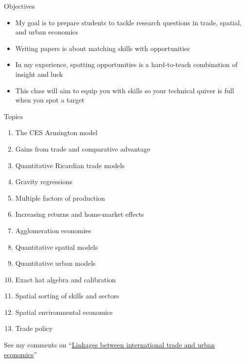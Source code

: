 \documentclass[10pt,notes=hide,aspectratio=169]{beamer}
\begin{document}
\begin{frame}{Objectives}
\begin{itemize}
\item My goal is to prepare students to tackle research questions in trade, spatial, and urban economics
\item Writing papers is about matching skills with opportunities
\item In my experience, spotting opportunities is a hard-to-teach combination of insight and luck
\item This class will aim to equip you with skills so your technical quiver is full when you spot a target
\end{itemize}
\end{frame}
\begin{frame}{Topics}
\begin{enumerate}
\item The CES Armington model
\item Gains from trade and comparative advantage
\item Quantitative Ricardian trade models
\item Gravity regressions
\item Multiple factors of production
\item Increasing returns and home-market effects
\item Agglomeration economies
\item Quantitative spatial models
\item Quantitative urban models
\item Exact hat algebra and calibration
\item Spatial sorting of skills and sectors
\item Spatial environmental economics
\item Trade policy
\end{enumerate}
See my comments on ``\href{https://tradediversion.net/2017/09/17/linkages-between-international-trade-and-urban-economics/}{Linkages between international trade and urban economics}''
\end{frame}
\end{document}
